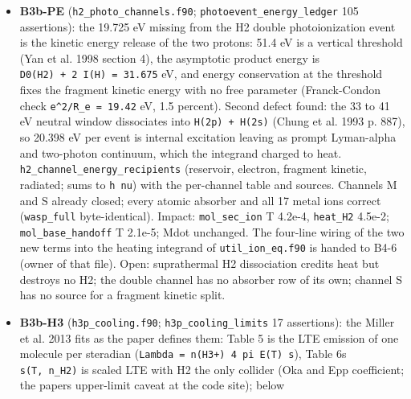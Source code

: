 \documentclass[english,a4paper]{my_memo}
\begin{document}
\begin{itemize}
  solver failure and falls back to marching, which ends on a du plateau
  with a state that certifies worse than the JFNK state; assigned to B3a
  (\texttt{info\ =\ 2} = a failed stationarity claim, written uncertified, exit 2, no
  fallback) and to B5a (\texttt{steady\_newton.f90}: the residual evaluated on the
  self-consistent composition of the current iterate, so gate, merit and
  returned state measure one thing). Also found: the JFNK stop message
  prints an unset \texttt{resid\_th} (B3a); \texttt{certification\_row\_measure} and
  \texttt{relnorm\_over\_cells} are one expression written twice.
\item
  \textbf{B3b-PE} (\texttt{h2\_photo\_channels.f90}; \texttt{photoevent\_energy\_ledger} 105
  assertions): the 19.725 eV missing from the H2 double photoionization
  event is the kinetic energy release of the two protons: 51.4 eV is a
  vertical threshold (Yan et al. 1998 section 4), the asymptotic product
  energy is \texttt{D0(H2)\ +\ 2\ I(H)\ =\ 31.675} eV, and energy conservation at the
  threshold fixes the fragment kinetic energy with no free parameter
  (Franck-Condon check \texttt{e\^{}2/R\_e\ =\ 19.42} eV, 1.5 percent). Second defect
  found: the 33 to 41 eV neutral window dissociates into \texttt{H(2p)\ +\ H(2s)}
  (Chung et al. 1993 p. 887), so 20.398 eV per event is internal excitation
  leaving as prompt Lyman-alpha and two-photon continuum, which the
  integrand charged to heat. \texttt{h2\_channel\_energy\_recipients} (reservoir,
  electron, fragment kinetic, radiated; sums to \texttt{h\ nu}) with the per-channel
  table and sources. Channels M and S already closed; every atomic absorber
  and all 17 metal ions correct (\texttt{wasp\_full} byte-identical). Impact:
  \texttt{mol\_sec\_ion} T 4.2e-4, \texttt{heat\_H2} 4.5e-2; \texttt{mol\_base\_handoff} T 2.1e-5;
  Mdot unchanged. The four-line wiring of the two new terms into the
  heating integrand of \texttt{util\_ion\_eq.f90} is handed to B4-6 (owner of that
  file). Open: suprathermal H2 dissociation credits heat but destroys no
  H2; the double channel has no absorber row of its own; channel S has no
  source for a fragment kinetic split.
\item
  \textbf{B3b-H3} (\texttt{h3p\_cooling.f90}; \texttt{h3p\_cooling\_limits} 17 assertions): the
  Miller et al. 2013 fits as the paper defines them: Table 5 is the LTE
  emission of one molecule per steradian (\texttt{Lambda\ =\ n(H3+)\ 4\ pi\ E(T)\ s}),
  Table 6\textquotesingle s \texttt{s(T,\ n\_H2)} is scaled LTE with H2 the only collider (Oka and
  Epp coefficient; the paper\textquotesingle s upper-limit caveat at the code site); below

\end{itemize}
\end{document}

